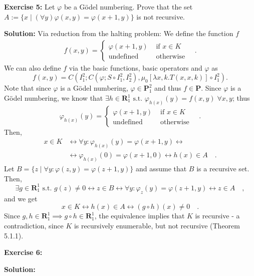 \documentclass [11pt]{article}
\newcommand{\R}{\textbf{R}}
\renewcommand{\P}{\textbf{P}}
\newcommand{\lra}{\ensuremath{\leftrightarrow}}
\begin{document}
\bigskip
\noindent
\textbf{Exercise 5:} Let $\varphi$ be a G\"odel numbering. Prove that the set $A:= \{x \mid (\forall y)\varphi(x,y) = \varphi(x+1,y)\}$ is not recursive.

\noindent
\textbf{Solution:} 
Via reduction from the halting problem:
We define the function $f$
\begin{align*}
 f(x,y) = \begin{cases}
           \varphi(x+1,y) & \text{ if } x \in K \\
           \text{undefined} & \text{ otherwise} 
          \end{cases} \quad .
\end{align*} 
We can also define $f$ via the basic functions, basic operators and $\varphi$ as
$$
f(x,y) = C(I^2_1; C(\varphi; S \circ I^2_1, I^2_2), \mu_0 [\lambda x,k.T(x,x,k)]\circ I^2_1).
$$
Note that since $\varphi$ is a G\"odel numbering, $\varphi \in \P^2_1$ and thus $f \in \P$.
Since $\varphi$ is a G\"odel numbering, we know that $\exists h \in \R^1_1 \text{ s.t.\ } \varphi_{h(x)}(y) = f(x,y) \;\forall x,y$; thus
$$
\varphi_{h(x)}(y) = \begin{cases}
           \varphi(x+1,y) & \text{ if } x \in K \\
           \text{undefined} & \text{ otherwise}
          \end{cases} \quad.
$$
Then,
\begin{align*}
x \in K &\lra \forall y: \varphi_{h(x)}(y) = \varphi(x+1,y) \lra \\
&\lra \varphi_{h(x)}(0) = \varphi(x+1,0) \lra h(x) \in A \quad . 
\end{align*}
Let $B = \{z \mid \forall y: \varphi(z,y) =  \varphi(z+1,y)\}$ and assume that $B$ is a recursive set.
Then, 
$$
\exists g \in \R^1_1 \text{ s.t.\ } g(z) \neq 0 \lra z \in B \lra \forall y: \varphi_z(y) = \varphi(z+1,y) \lra z \in A \quad ,
$$
and we get 
$$
x \in K \lra h(x) \in A \lra (g \circ h)(x) \neq 0 \quad .
$$
Since $g,h \in \R^1_1 \implies g\circ h \in \R^1_1$, the equivalence implies that $K$ is recursive - a contradiction, since $K$ is recursively enumerable, but not recursive (Theorem 5.1.1).

\bigskip
\noindent
\textbf{Exercise 6:}

\noindent
\textbf{Solution:}
\end{document}
